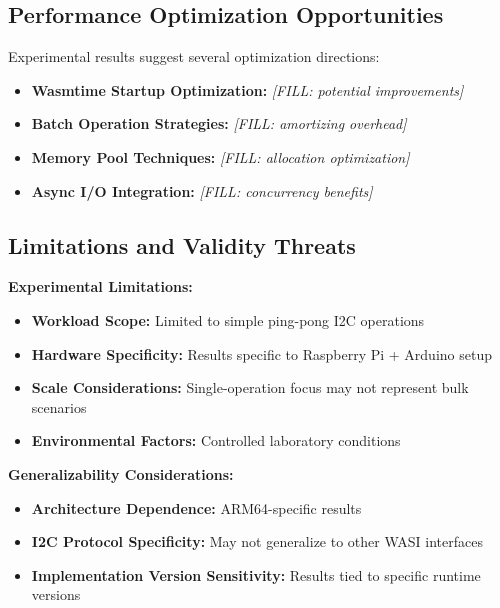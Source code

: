 \subsection{Performance Optimization Opportunities}
\label{subsec:optimization-opportunities}

Experimental results suggest several optimization directions:

\begin{itemize}
    \item \textbf{Wasmtime Startup Optimization:} \textit{[FILL: potential improvements]}
    \item \textbf{Batch Operation Strategies:} \textit{[FILL: amortizing overhead]}
    \item \textbf{Memory Pool Techniques:} \textit{[FILL: allocation optimization]}
    \item \textbf{Async I/O Integration:} \textit{[FILL: concurrency benefits]}
\end{itemize}

\subsection{Limitations and Validity Threats}
\label{subsec:limitations}

\textbf{Experimental Limitations:}
\begin{itemize}
    \item \textbf{Workload Scope:} Limited to simple ping-pong I2C operations
    \item \textbf{Hardware Specificity:} Results specific to Raspberry Pi + Arduino setup
    \item \textbf{Scale Considerations:} Single-operation focus may not represent bulk scenarios
    \item \textbf{Environmental Factors:} Controlled laboratory conditions
\end{itemize}

\textbf{Generalizability Considerations:}
\begin{itemize}
    \item \textbf{Architecture Dependence:} ARM64-specific results
    \item \textbf{I2C Protocol Specificity:} May not generalize to other WASI interfaces
    \item \textbf{Implementation Version Sensitivity:} Results tied to specific runtime versions
\end{itemize}


